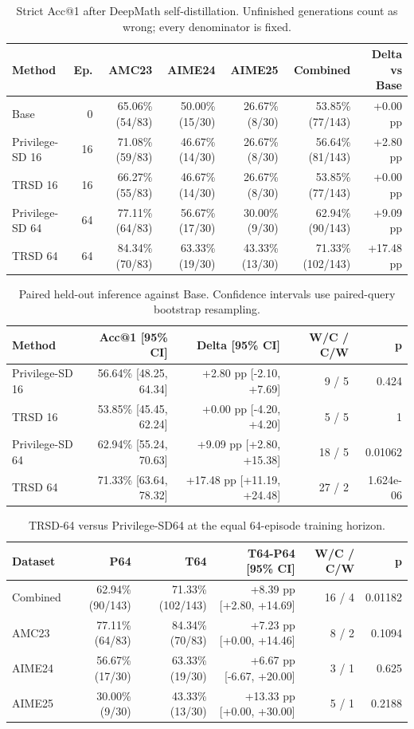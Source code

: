\begin{table}[t]
\centering
\small
\caption{Strict Acc@1 after DeepMath self-distillation. Unfinished generations count as wrong; every denominator is fixed.}
\label{tab:trsd-main-accuracy}
\begin{tabular}{lrrrrrr}
\toprule
Method & Ep. & AMC23 & AIME24 & AIME25 & Combined & Delta vs Base \\
\midrule
Base & 0 & 65.06\% (54/83) & 50.00\% (15/30) & 26.67\% (8/30) & 53.85\% (77/143) & +0.00 pp \\
Privilege-SD 16 & 16 & 71.08\% (59/83) & 46.67\% (14/30) & 26.67\% (8/30) & 56.64\% (81/143) & +2.80 pp \\
TRSD 16 & 16 & 66.27\% (55/83) & 46.67\% (14/30) & 26.67\% (8/30) & 53.85\% (77/143) & +0.00 pp \\
Privilege-SD 64 & 64 & 77.11\% (64/83) & 56.67\% (17/30) & 30.00\% (9/30) & 62.94\% (90/143) & +9.09 pp \\
TRSD 64 & 64 & 84.34\% (70/83) & 63.33\% (19/30) & 43.33\% (13/30) & 71.33\% (102/143) & +17.48 pp \\
\bottomrule
\end{tabular}
\end{table}

\begin{table}[t]
\centering
\small
\caption{Paired held-out inference against Base. Confidence intervals use paired-query bootstrap resampling.}
\label{tab:trsd-paired-base}
\begin{tabular}{lrrrr}
\toprule
Method & Acc@1 [95\% CI] & Delta [95\% CI] & W/C / C/W & p \\
\midrule
Privilege-SD 16 & 56.64\% [48.25, 64.34] & +2.80 pp [-2.10, +7.69] & 9 / 5 & 0.424 \\
TRSD 16 & 53.85\% [45.45, 62.24] & +0.00 pp [-4.20, +4.20] & 5 / 5 & 1 \\
Privilege-SD 64 & 62.94\% [55.24, 70.63] & +9.09 pp [+2.80, +15.38] & 18 / 5 & 0.01062 \\
TRSD 64 & 71.33\% [63.64, 78.32] & +17.48 pp [+11.19, +24.48] & 27 / 2 & 1.624e-06 \\
\bottomrule
\end{tabular}
\end{table}

\begin{table}[t]
\centering
\small
\caption{TRSD-64 versus Privilege-SD64 at the equal 64-episode training horizon.}
\label{tab:trsd64-p64}
\begin{tabular}{lrrrrr}
\toprule
Dataset & P64 & T64 & T64-P64 [95\% CI] & W/C / C/W & p \\
\midrule
Combined & 62.94\% (90/143) & 71.33\% (102/143) & +8.39 pp [+2.80, +14.69] & 16 / 4 & 0.01182 \\
AMC23 & 77.11\% (64/83) & 84.34\% (70/83) & +7.23 pp [+0.00, +14.46] & 8 / 2 & 0.1094 \\
AIME24 & 56.67\% (17/30) & 63.33\% (19/30) & +6.67 pp [-6.67, +20.00] & 3 / 1 & 0.625 \\
AIME25 & 30.00\% (9/30) & 43.33\% (13/30) & +13.33 pp [+0.00, +30.00] & 5 / 1 & 0.2188 \\
\bottomrule
\end{tabular}
\end{table}

